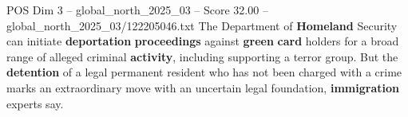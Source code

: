 \begin{textsample}{POS Dim 3 – global\_north\_2025\_03 – Score 32.00 – global\_north\_2025\_03/122205046.txt}
The Department of \textbf{Homeland} Security can initiate \textbf{deportation} \textbf{proceedings} against \textbf{green} \textbf{card} holders for a broad range of alleged criminal \textbf{activity}, including supporting a terror group.
But the \textbf{detention} of a legal permanent resident who has not been charged with a crime marks an extraordinary move with an uncertain legal foundation, \textbf{immigration} experts say.

\end{textsample}
